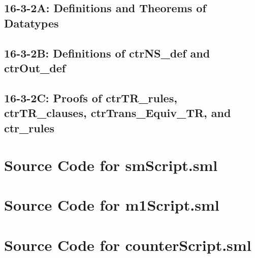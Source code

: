 \documentclass{report}
\begin{document}
\section{16-3-2A: Definitions and Theorems of Datatypes}
\label{defs-16-3-2-A}




\section{16-3-2B: Definitions of ctrNS_def and ctrOut_def}
\label{defs-16-3-2-B}




\section{16-3-2C: Proofs of ctrTR_rules, ctrTR_clauses, ctrTrans_Equiv_TR, and ctr_rules}
\label{proofs-16-3-2-C}




\appendix{}

\chapter{Source Code for smScript.sml}
\label{cha:source-code-sm}


\chapter{Source Code for m1Script.sml}
\label{cha:source-code-m1}


\chapter{Source Code for counterScript.sml}
\label{cha:source-code-counter}

\end{document}
